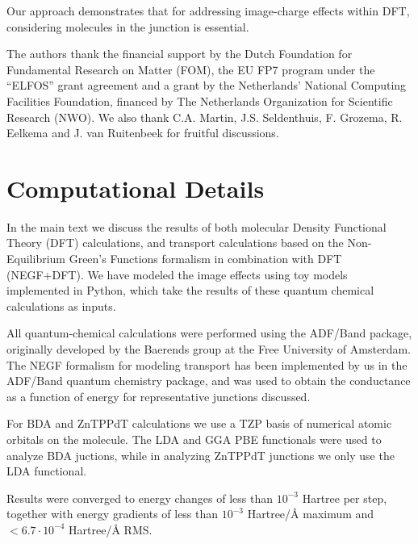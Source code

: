 \documentclass[aip,jcp,a4paper,reprint,floatfix,superscriptaddress]{revtex4-1}
\begin{document}
Our approach demonstrates that for addressing image-charge effects within DFT, considering molecules in the junction is essential.

\begin{acknowledgements}
The authors thank the financial support by the Dutch Foundation for Fundamental Research on Matter (FOM), the EU FP7 program under the ``ELFOS'' grant agreement and a grant by the Netherlands' National Computing Facilities Foundation, financed by The Netherlands Organization for Scientific Research (NWO). We also thank C.A. Martin, J.S. Seldenthuis, F. Grozema, R. Eelkema and J. van Ruitenbeek for fruitful discussions.
\end{acknowledgements}






\clearpage
\appendix



\section{Computational Details}\label{computational_methods}

In the main text we discuss the results of both molecular Density Functional Theory (DFT) calculations, and transport calculations based on the Non-Equilibrium Green's Functions formalism in combination with DFT (NEGF+DFT).\cite{Meir1992,Datta2000} We have modeled the image effects using toy models implemented in Python, which take the results of these quantum chemical calculations as inputs.

All quantum-chemical calculations were performed using the ADF/Band package,\cite{Velde1991,Wiesenekker1991,Verzijl2012} originally developed by the Baerends group at the Free University of Amsterdam. The NEGF formalism for modeling transport has been implemented by us in the ADF/Band quantum chemistry package,\cite{Verzijl2012} and was used to obtain the conductance as a function of energy for representative junctions discussed. 

For BDA and ZnTPPdT calculations we use a TZP basis of numerical atomic orbitals on the molecule. The LDA and GGA PBE functionals were used to analyze BDA juctions, while in analyzing ZnTPPdT junctions we only use the LDA functional.

Results were converged to energy changes of less than $10^{-3}$ Hartree per step, together with energy gradients of less than $10^{-3}$ Hartree/\AA\xspace maximum and $<6.7\cdot 10^{-4}$ Hartree/\AA\xspace RMS.
\end{document}
